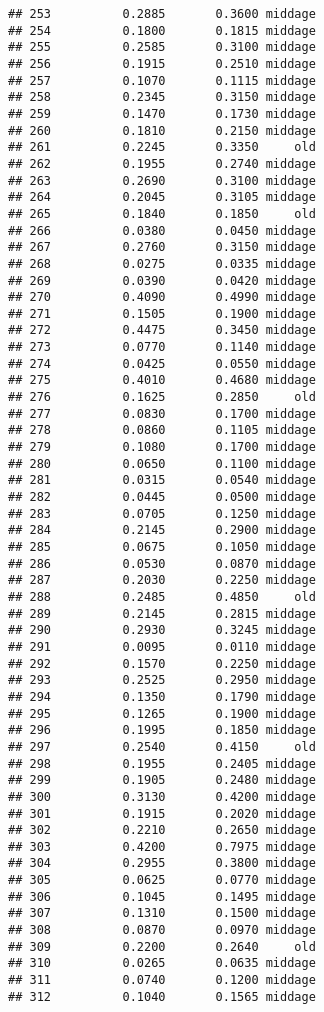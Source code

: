 \documentclass[
]{article}
\begin{document}
\begin{verbatim}
## 253          0.2885       0.3600 middage
## 254          0.1800       0.1815 middage
## 255          0.2585       0.3100 middage
## 256          0.1915       0.2510 middage
## 257          0.1070       0.1115 middage
## 258          0.2345       0.3150 middage
## 259          0.1470       0.1730 middage
## 260          0.1810       0.2150 middage
## 261          0.2245       0.3350     old
## 262          0.1955       0.2740 middage
## 263          0.2690       0.3100 middage
## 264          0.2045       0.3105 middage
## 265          0.1840       0.1850     old
## 266          0.0380       0.0450 middage
## 267          0.2760       0.3150 middage
## 268          0.0275       0.0335 middage
## 269          0.0390       0.0420 middage
## 270          0.4090       0.4990 middage
## 271          0.1505       0.1900 middage
## 272          0.4475       0.3450 middage
## 273          0.0770       0.1140 middage
## 274          0.0425       0.0550 middage
## 275          0.4010       0.4680 middage
## 276          0.1625       0.2850     old
## 277          0.0830       0.1700 middage
## 278          0.0860       0.1105 middage
## 279          0.1080       0.1700 middage
## 280          0.0650       0.1100 middage
## 281          0.0315       0.0540 middage
## 282          0.0445       0.0500 middage
## 283          0.0705       0.1250 middage
## 284          0.2145       0.2900 middage
## 285          0.0675       0.1050 middage
## 286          0.0530       0.0870 middage
## 287          0.2030       0.2250 middage
## 288          0.2485       0.4850     old
## 289          0.2145       0.2815 middage
## 290          0.2930       0.3245 middage
## 291          0.0095       0.0110 middage
## 292          0.1570       0.2250 middage
## 293          0.2525       0.2950 middage
## 294          0.1350       0.1790 middage
## 295          0.1265       0.1900 middage
## 296          0.1995       0.1850 middage
## 297          0.2540       0.4150     old
## 298          0.1955       0.2405 middage
## 299          0.1905       0.2480 middage
## 300          0.3130       0.4200 middage
## 301          0.1915       0.2020 middage
## 302          0.2210       0.2650 middage
## 303          0.4200       0.7975 middage
## 304          0.2955       0.3800 middage
## 305          0.0625       0.0770 middage
## 306          0.1045       0.1495 middage
## 307          0.1310       0.1500 middage
## 308          0.0870       0.0970 middage
## 309          0.2200       0.2640     old
## 310          0.0265       0.0635 middage
## 311          0.0740       0.1200 middage
## 312          0.1040       0.1565 middage

\end{verbatim}
\end{document}
